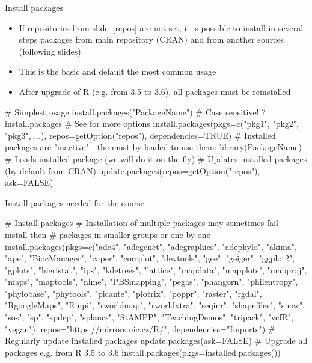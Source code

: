 \documentclass[compress, ucs, xelatex, 11pt, xcolor=svgnames, aspectratio=169,
	hyperref={
		bookmarks=true,
		unicode=true,
		colorlinks=true,
		pdftitle={Molecular data in R},
		plainpages=false,
		pdfauthor={Vojtech Zeisek},
		pdfsubject={Course about phylogeny and evolution in R},
		pdfcreator={XeLaTeX},
		pdfkeywords={R, evolution, phylogeny, molecular data},
		linkcolor=Crimson, %
		anchorcolor=Magenta, %
		citecolor=Magenta, %
		filecolor=Magenta, %
		menucolor=Magenta, %
		urlcolor=DodgerBlue, %
		pdftex},
	url={hyphens, lowtilde} %
	]{beamer}
\begin{document}
\begin{frame}[fragile]{Install packages}
	\begin{itemize}
		\item If repositories from slide~\ref{repos} are not set, it is possible to install in several steps packages from main repository (CRAN) and from another sources (following slides)
		\item This is the basic and default the most common usage
		\item After upgrade of R (e.g. from 3.5 to 3.6), all packages must be reinstalled
	\end{itemize}
	\begin{spluscode}
    # Simplest usage
    install.packages("PackageName") # Case sensitive!
    ?install.packages # See for more options
    install.packages(pkgs=c("pkg1", "pkg2", "pkg3", ...),
      repos=getOption("repos"), dependencies=TRUE)
    # Installed packages are "inactive" - the must by loaded to use them:
    library(PackageName) # Loads installed package (we will do it on the fly)
    # Updates installed packages (by default from CRAN)
    update.packages(repos=getOption("repos"), ask=FALSE)
	\end{spluscode}
\end{frame}

\begin{frame}[fragile]{Install packages needed for the course}
	\begin{spluscode}
    # Install packages
    # Installation of multiple packages may sometimes fail - install then
    # packages in smaller groups or one by one
    install.packages(pkgs=c("ade4", "adegenet", "adegraphics", "adephylo",
      "akima", "ape", "BiocManager", "caper", "corrplot", "devtools",
      "gee", "geiger", "ggplot2", "gplots", "hierfstat", "ips", "kdetrees",
      "lattice", "mapdata", "mapplots", "mapproj", "maps", "maptools",
      "nlme", "PBSmapping", "pegas", "phangorn", "philentropy", "phylobase",
      "phytools", "picante", "plotrix", "poppr", "raster", "rgdal",
      "RgoogleMaps", "Rmpi", "rworldmap",  "rworldxtra", "seqinr",
      "shapefiles", "snow", "sos", "sp", "spdep", "splancs", "StAMPP",
      "TeachingDemos", "tripack", "vcfR", "vegan"),
      repos="https://mirrors.nic.cz/R/", dependencies="Imports")
    # Regularly update installed packages
    update.packages(ask=FALSE)
    # Upgrade all packages e.g. from R 3.5 to 3.6
    install.packages(pkgs=installed.packages())
	\end{spluscode}
\end{frame}
\end{document}
